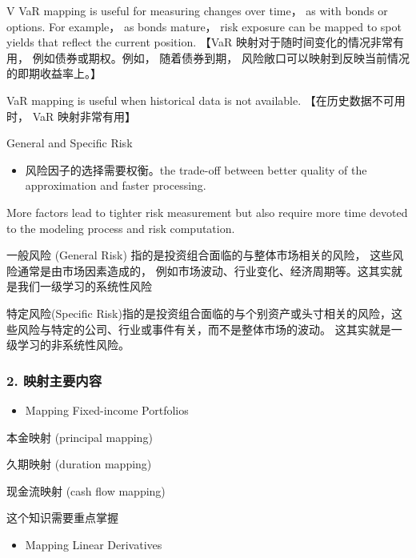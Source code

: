     V VaR mapping is useful for measuring changes over time， as with bonds or options. For example， as bonds mature， risk exposure can be mapped to spot yields that reflect the current position. 【VaR 映射对于随时间变化的情况非常有用， 例如债券或期权。例如， 随着债券到期， 风险敞口可以映射到反映当前情况的即期收益率上。】
    
    VaR mapping is useful when historical data is not available. 【在历史数据不可用时， VaR 映射非常有用】
    
General and Specific Risk
    
    \begin{itemize}
    \item 风险因子的选择需要权衡。the trade-off between better quality of the approximation and faster processing.
    \end{itemize}
    
    More factors lead to tighter risk measurement but also require more time devoted to the modeling process and risk computation.
    
     一般风险 (General Risk) 指的是投资组合面临的与整体市场相关的风险， 这些风险通常是由市场因素造成的， 例如市场波动、行业变化、经济周期等。这其实就是我们一级学习的系统性风险
    
    特定风险(Specific Risk)指的是投资组合面临的与个别资产或头寸相关的风险，这些风险与特定的公司、行业或事件有关，而不是整体市场的波动。 这其实就是一级学习的非系统性风险。
    



    \subsubsection{    2. 映射主要内容    }


    \begin{itemize}
    \item Mapping Fixed-income Portfolios
    \end{itemize}
    
    本金映射 (principal mapping)
    
     久期映射 (duration mapping)
    
     现金流映射 (cash flow mapping)
    
    这个知识需要重点掌握
    
    \begin{itemize}
    \item Mapping Linear Derivatives
    \end{itemize}
    
